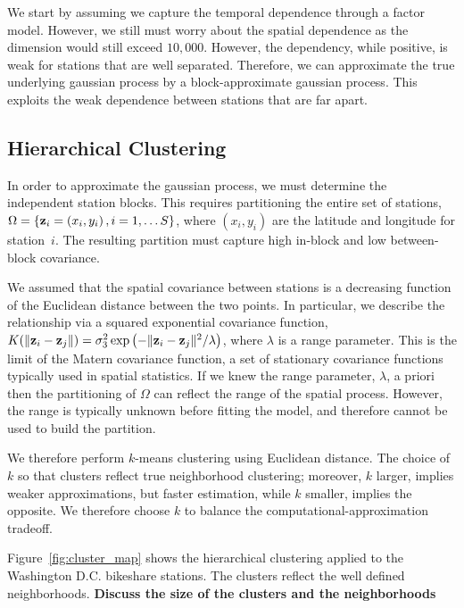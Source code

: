 \documentclass{acm_proc_article-sp}
\begin{document}
We start by assuming we capture the temporal dependence through a factor model.  However, we still must worry about the spatial dependence as the dimension would still exceed $10,000$.   However, the dependency, while positive, is weak for stations that are well separated.  Therefore, we can approximate the true underlying gaussian process by a block-approximate gaussian process. This exploits the weak dependence between stations that are far apart.  

\subsection{Hierarchical Clustering}\label{clustering}
In order to approximate the gaussian process, we must determine the independent station blocks.  This requires partitioning the entire set of stations, $\Omega = \{ {\bf z}_i = (x_i, y_i) \, , i = 1,\ldots S\}$, where $(x_i, y_i)$ are the latitude and longitude for station~$i$. The resulting partition must capture high in-block and low between-block covariance.  

We assumed that the spatial covariance between stations is a decreasing function of the Euclidean distance between the two points.  In particular, we describe the relationship via a squared exponential covariance function, $K(\| {\bf z}_i - {\bf z}_j \|) = \sigma_3^2 \exp \left( - \| {\bf z}_i - {\bf z}_j \|^2/ \lambda \right)$, where $\lambda$ is a range parameter.  This is the limit of the Matern covariance function, a set of stationary covariance functions typically used in spatial statistics.  If we knew the range parameter, $\lambda$, a priori then the partitioning of $\Omega$ can reflect the range of the spatial process.  However, the range is typically unknown before fitting the model, and therefore cannot be used to build the partition.

We therefore perform $k$-means clustering using Euclidean distance.  The choice of $k$ so that clusters reflect true neighborhood clustering; moreover, $k$ larger, implies weaker approximations, but faster estimation, while $k$ smaller, implies the opposite.  We therefore choose $k$ to balance the computational-approximation tradeoff.

Figure~\ref{fig:cluster_map} shows the hierarchical clustering applied to the Washington D.C. bikeshare stations.  The clusters reflect the well defined neighborhoods.  {\bf Discuss the size of the clusters and the neighborhoods}
\end{document}
